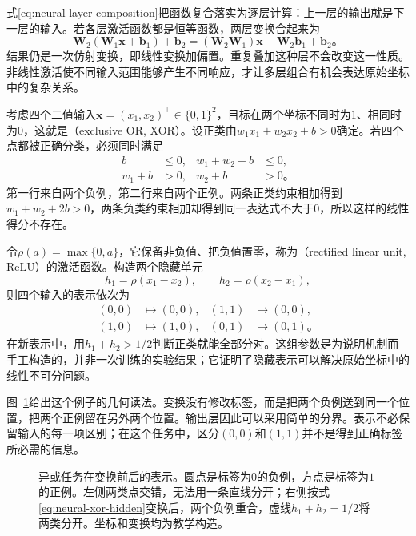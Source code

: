 式\eqref{eq:neural-layer-composition}把函数复合落实为逐层计算：上一层的输出就是下一层的输入。若各层激活函数都是恒等函数，两层变换合起来为
\[
  \bm{W}_2(\bm{W}_1\bm{x}+\bm{b}_1)+\bm{b}_2
  =(\bm{W}_2\bm{W}_1)\bm{x}+\bm{W}_2\bm{b}_1+\bm{b}_2\text{。}
\]
结果仍是一次仿射变换，即线性变换加偏置。重复叠加这种层不会改变这一性质。非线性激活使不同输入范围能够产生不同响应，才让多层组合有机会表达原始坐标中的复杂关系。

\begin{example}[异或的表示变换]
  \label{ex:neural-xor-representation}
  考虑四个二值输入$\bm{x}=(x_1,x_2)^{\top}\in\{0,1\}^{2}$，目标在两个坐标不同时为$1$、相同时为$0$，这就是（exclusive OR, XOR）。设正类由$w_1x_1+w_2x_2+b>0$确定。若四个点都被正确分类，必须同时满足
  \[
    \begin{aligned}
      b&\leq0,& w_1+w_2+b&\leq0,\\
      w_1+b&>0,& w_2+b&>0\text{。}
    \end{aligned}
  \]
  第一行来自两个负例，第二行来自两个正例。两条正类约束相加得到$w_1+w_2+2b>0$，两条负类约束相加却得到同一表达式不大于$0$，所以这样的线性得分不存在。

  令$\rho(a)=\max\{0,a\}$，它保留非负值、把负值置零，称为（rectified linear unit, ReLU）的激活函数。构造两个隐藏单元
  \begin{equation}
    h_1=\rho(x_1-x_2),\qquad h_2=\rho(x_2-x_1),
    \label{eq:neural-xor-hidden}
  \end{equation}
  则四个输入的表示依次为
  \[
    \begin{aligned}
      (0,0)&\mapsto(0,0),& (1,1)&\mapsto(0,0),\\
      (1,0)&\mapsto(1,0),& (0,1)&\mapsto(0,1)\text{。}
    \end{aligned}
  \]
  在新表示中，用$h_1+h_2>1/2$判断正类就能全部分对。这组参数是为说明机制而手工构造的，并非一次训练的实验结果；它证明了隐藏表示可以解决原始坐标中的线性不可分问题。
\end{example}

图~\ref{fig:neural-xor-representation}给出这个例子的几何读法。变换没有修改标签，而是把两个负例送到同一个位置，把两个正例留在另外两个位置。输出层因此可以采用简单的分界。表示不必保留输入的每一项区别；在这个任务中，区分$(0,0)$和$(1,1)$并不是得到正确标签所必需的信息。

\begin{figure}[htbp]
  \centering
  
  \caption{异或任务在变换前后的表示。圆点是标签为$0$的负例，方点是标签为$1$的正例。左侧两类点交错，无法用一条直线分开；右侧按式\eqref{eq:neural-xor-hidden}变换后，两个负例重合，虚线$h_1+h_2=1/2$将两类分开。坐标和变换均为教学构造。}
  \label{fig:neural-xor-representation}
\end{figure}

